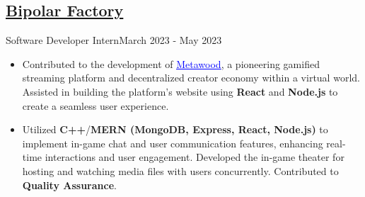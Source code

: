 \subsection{\href{https://www.bipolarfactory.com}{Bipolar Factory }}{Software Developer Intern}{March 2023 - May 2023}
\begin{itemize}

    \item Contributed to the development of \href{https://www.themetawood.com}{\textcolor{blue}{\underline{Metawood}}}, a pioneering gamified streaming platform and decentralized creator economy within a virtual world. Assisted in building the platform's website using \textbf{React} and \textbf{Node.js} to create a seamless user experience.
\item Utilized \textbf{C++}/\textbf{MERN (MongoDB, Express, React, Node.js)} to implement in-game chat and user communication features, enhancing real-time interactions and user engagement. Developed the in-game theater for hosting and watching media files with users concurrently. Contributed to \textbf{Quality Assurance}.

\end{itemize}
